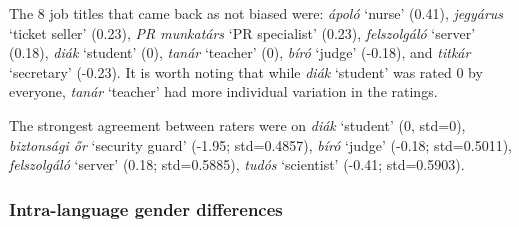 \documentclass[11pt]{article}
\begin{document}


The 8 job titles that came back as not biased were: \textit{ápoló} `nurse' (0.41), \textit{jegyárus} `ticket seller' (0.23), \textit{PR munkatárs} `PR specialist' (0.23), \textit{felszolgáló} `server' (0.18),  \textit{diák} `student' (0), \textit{tanár} `teacher' (0), \textit{bíró} `judge' (-0.18), and \textit{titkár} `secretary' (-0.23). It is worth noting that while \textit{diák} `student' was rated 0 by everyone, \textit{tanár} `teacher' had more individual variation in the ratings.

The strongest agreement between raters were on \textit{diák} `student' (0, std=0), \textit{biztonsági őr} `security guard' (-1.95; std=0.4857), \textit{bíró} `judge' (-0.18; std=0.5011), \textit{felszolgáló} `server' (0.18; std=0.5885), \textit{tudós} `scientist' (-0.41; std=0.5903).

\subsubsection{Intra-language gender differences}
\end{document}
